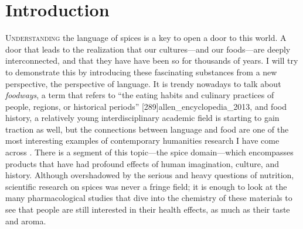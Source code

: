 



\chapter{Introduction}
\label{ch:introduction}





\lettrine[lines=\iniciale]{\textcolor{\accentcolor}{U}}{nderstanding} the language of spices is a key to open a door to this world. A door that leads to the realization that our cultures---and our foods---are deeply interconnected, and that they have have been so for thousands of years. I will try to demonstrate this by introducing these fascinating substances from a new perspective, the perspective of language. It is trendy nowadays to talk about \textit{foodways}, a term that refers to ``the eating habits and culinary practices of people, regions, or historical periods'' [289]{allen_encyclopedia_2013}, and food history, a relatively young interdisciplinary academic field is starting to gain traction as well, but the connections between language and food are one of the most interesting examples of contemporary humanities research I have come across \textcite[see][]{jurafsky_language_2014}. There is a segment of this topic---the spice domain---which encompasses products that have had profound effects of human imagination, culture, and history. Although overshadowed by the serious and heavy questions of nutrition, scientific research on spices was never a fringe field; it is enough to look at the many pharmacological studies that dive into the chemistry of these materials to see that people are still interested in their health effects, as much as their taste and aroma.

